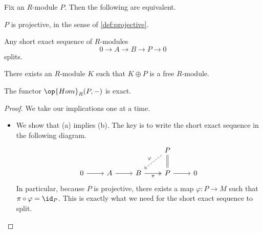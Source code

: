 \begin{lemma} \label{lem:projgrabbag}
	Fix an $R$-module $P$. Then the following are equivalent.
	\begin{listalph}
		\item $P$ is projective, in the sense of \autoref{def:projective}.
		\item Any short exact sequence of $R$-modules
		\[0\to A\to B\to P\to 0\]
		splits.
		\item There exists an $R$-module $K$ such that $K\oplus P$ is a free $R$-module.
		\item The functor $\op{Hom}_R(P,-)$ is exact.
	\end{listalph}
\end{lemma}
\begin{proof}
	We take our implications one at a time.
	\begin{itemize}
		\item We show that (a) implies (b). The key is to write the short exact sequence in the following diagram.
		\[\begin{tikzcd}
			&&& P \\
			0 & A & B & P & 0
			\arrow[Rightarrow, no head, from=1-4, to=2-4]
			\arrow["\varphi"', dashed, from=1-4, to=2-3]
			\arrow["\pi"', two heads, from=2-3, to=2-4]
			\arrow[from=2-1, to=2-2]
			\arrow[from=2-2, to=2-3]
			\arrow[from=2-4, to=2-5]
		\end{tikzcd}\]
		In particular, because $P$ is projective, there exists a map $\varphi:P\to M$ such that $\pi\circ\varphi=\id_P$. This is exactly what we need for the short exact sequence to split.


\end{itemize}
\end{proof}
